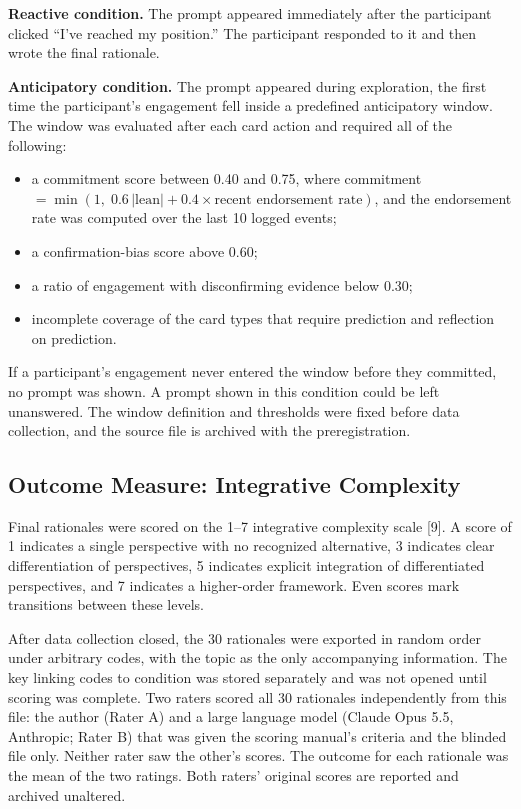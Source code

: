 \documentclass[12pt,letterpaper]{article}
\begin{document}
\textbf{Reactive condition.} The prompt appeared immediately after the participant clicked ``I've reached my position.'' The participant responded to it and then wrote the final rationale.

\textbf{Anticipatory condition.} The prompt appeared during exploration, the first time the participant's engagement fell inside a predefined anticipatory window. The window was evaluated after each card action and required all of the following:
\begin{itemize}
\item a commitment score between 0.40 and 0.75, where commitment $= \min(1,\; 0.6\,|\mathrm{lean}| + 0.4 \times \text{recent endorsement rate})$, and the endorsement rate was computed over the last 10 logged events;
\item a confirmation-bias score above 0.60;
\item a ratio of engagement with disconfirming evidence below 0.30;
\item incomplete coverage of the card types that require prediction and reflection on prediction.
\end{itemize}
If a participant's engagement never entered the window before they committed, no prompt was shown. A prompt shown in this condition could be left unanswered. The window definition and thresholds were fixed before data collection, and the source file is archived with the preregistration.

\subsection{Outcome Measure: Integrative Complexity}
Final rationales were scored on the 1--7 integrative complexity scale [9]. A score of 1 indicates a single perspective with no recognized alternative, 3 indicates clear differentiation of perspectives, 5 indicates explicit integration of differentiated perspectives, and 7 indicates a higher-order framework. Even scores mark transitions between these levels.

After data collection closed, the 30 rationales were exported in random order under arbitrary codes, with the topic as the only accompanying information. The key linking codes to condition was stored separately and was not opened until scoring was complete. Two raters scored all 30 rationales independently from this file: the author (Rater A) and a large language model (Claude Opus 5.5, Anthropic; Rater B) that was given the scoring manual's criteria and the blinded file only. Neither rater saw the other's scores. The outcome for each rationale was the mean of the two ratings. Both raters' original scores are reported and archived unaltered.
\end{document}
